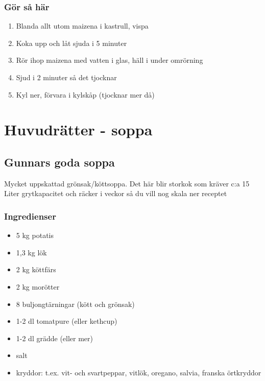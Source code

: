 \documentclass[a4paper,11pt,twocolumn]{article}
\begin{document}
\subsubsection*{Gör så här}
\begin{enumerate}[label=\arabic*.]
    \item Blanda allt utom maizena i kastrull, vispa
    \item Koka upp och låt sjuda i 5 minuter
    \item Rör ihop maizena med vatten i glas, häll i under omrörning
    \item Sjud i 2 minuter så det tjocknar
    \item Kyl ner, förvara i kylskåp (tjocknar mer då)
\end{enumerate}





\newpage
\section{Huvudrätter - soppa}
\subsection{Gunnars goda soppa}
Mycket uppskattad grönsak/köttsoppa. Det här blir storkok som kräver c:a 15 Liter grytkapacitet och räcker i veckor så du vill nog skala ner receptet
\subsubsection*{Ingredienser}
\begin{itemize}[noitemsep]
    \item 5 kg potatis
    \item 1,3 kg lök
    \item 2 kg köttfärs
    \item 2 kg morötter
    \item 8 buljongtärningar (kött och grönsak)
    \item 1-2 dl tomatpure (eller kethcup)
    \item 1-2 dl grädde (eller mer)
    \item salt
    \item kryddor: t.ex. vit- och svartpeppar, vitlök, oregano, salvia, franska örtkryddor
\end{itemize}
\end{document}
